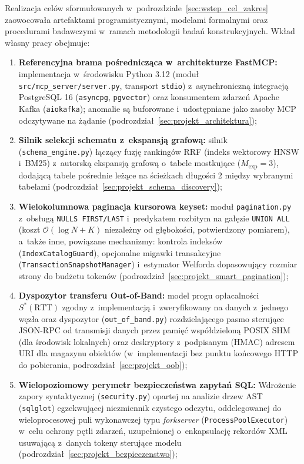 Realizacja celów sformułowanych w~podrozdziale~\ref{sec:wstep_cel_zakres} zaowocowała artefaktami programistycznymi, modelami formalnymi oraz procedurami badawczymi w~ramach metodologii badań konstrukcyjnych. Wkład własny pracy obejmuje:
\begin{enumerate}
    \item \textbf{Referencyjna brama pośrednicząca w~architekturze FastMCP:} implementacja w~środowisku Python 3.12 (moduł \texttt{src/mcp\_server/server.py}, transport \texttt{stdio}) z~asynchroniczną integracją PostgreSQL 16 (\texttt{asyncpg}, \texttt{pgvector}) oraz konsumentem zdarzeń Apache Kafka (\texttt{aiokafka}); anomalie są buforowane i~udostępniane jako zasoby MCP odczytywane na żądanie (podrozdział~\ref{sec:projekt_architektura});
    \item \textbf{Silnik selekcji schematu z~ekspansją grafową:} silnik (\texttt{schema\_engine.py}) łączący fuzję rankingów RRF (indeks wektorowy HNSW i~BM25) z~autorską ekspansją grafową o~tabele mostkujące ($M_{\text{exp}} = 3$), dodającą tabele pośrednie leżące na ścieżkach długości 2 między wybranymi tabelami (podrozdział~\ref{sec:projekt_schema_discovery});
    \item \textbf{Wielokolumnowa paginacja kursorowa keyset:} moduł \texttt{pagination.py} z~obsługą \texttt{NULLS FIRST/LAST} i~predykatem rozbitym na gałęzie \texttt{UNION ALL} (koszt $\mathcal{O}(\log N + K)$ niezależny od głębokości, potwierdzony pomiarem), a~także inne, powiązane mechanizmy: kontrola indeksów (\texttt{IndexCatalogGuard}), opcjonalne migawki transakcyjne (\texttt{TransactionSnapshotManager}) i~estymator Welforda dopasowujący rozmiar strony do budżetu tokenów (podrozdział~\ref{sec:projekt_smart_pagination});
    \item \textbf{Dyspozytor transferu Out-of-Band:} model progu opłacalności $S^*(\text{RTT})$ zgodny z~implementacją i~zweryfikowany na danych z~jednego węzła oraz dyspozytor (\texttt{out\_of\_band.py}) rozdzielającego pasmo sterujące JSON-RPC od transmisji danych przez pamięć współdzieloną POSIX SHM (dla środowisk lokalnych) oraz deskryptory z~podpisanym (HMAC) adresem URI dla magazynu obiektów (w~implementacji bez punktu końcowego HTTP do pobierania, podrozdział~\ref{sec:projekt_oob});
    \item \textbf{Wielopoziomowy perymetr bezpieczeństwa zapytań SQL:} Wdrożenie zapory syntaktycznej (\texttt{security.py}) opartej na analizie drzew AST (\texttt{sqlglot}) egzekwującej niezmiennik czystego odczytu, oddelegowanej do wieloprocesowej puli wykonawczej typu \emph{forkserver} (\texttt{ProcessPoolExecutor}) w~celu ochrony pętli zdarzeń, uzupełnionej o~enkapsulację rekordów XML usuwającą z~danych tokeny sterujące modelu (podrozdział~\ref{sec:projekt_bezpieczenstwo});

\end{enumerate}

